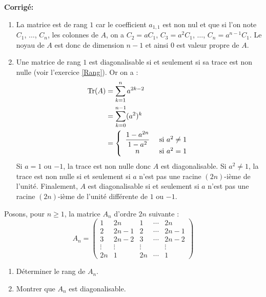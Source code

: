 \documentclass[a4paper,twoside,french,10pt]{VcCours}
\newcommand{\corr}{\textbf{Corrigé:}}
\begin{document}
\corr 
\begin{enumerate}
\item La matrice est de rang $1$ car le coefficient $a_{1,1}$ est non nul et que si l'on note $C_1$, $\ldots$, $C_n$, les colonnes de $A$, on a $C_2= aC_1$, $C_3=a^2 C_1$, $\ldots$, $C_n=a^{n-1} C_1$. Le noyau de $A$ est donc de dimension $n-1$ et ainsi $0$ est valeur propre de $A$.
\item Une matrice de rang $1$ est diagonalisable si et seulement si sa trace est non nulle (voir l'exercice \ref{Rang}). Or on a :
\begin{align*}
 \textrm{Tr}(A) & = \sum_{k=1}^n a^{2k-2} \\
 & = \sum_{k=0}^{n-1} (a^2)^k \\
 & = \left\lbrace \begin{array}{cl}
 \dfrac{1-a^{2n}}{1-a^2} & \hbox{ si } a^2 \neq 1 \\
 n & \hbox{ si } a^2 = 1 
 \end{array}\right. 
 \end{align*}
 Si $a=1$ ou $-1$, la trace est non nulle donc $A$ est diagonalisable. Si $a^2 \neq 1$, la trace est non nulle si et seulement si $a$ n'est pas une racine $(2n)$-ième de l'unité. Finalement, $A$ est diagonalisable si et seulement si $a$ n'est pas une racine $(2n)$-ième de l'unité différente de $1$ ou $-1$.
\end{enumerate}

\begin{Exercice}{} Posons, pour $n \geq 1$, la matrice $A_n$ d'ordre $2n$ suivante :
$$ A_n = \begin{pmatrix}
1 & 2n & 1 & \cdots & 2n \\
2 & 2n-1 & 2 & \cdots & 2n-1 \\
3 & 2n-2 & 3 & \cdots & 2n-2 \\
\vdots & \vdots & \vdots &  & \vdots \\
2n & 1 & 2n & \cdots & 1
\end{pmatrix}$$

\begin{enumerate}
\item Déterminer le rang de $A_n$.
\item Montrer que $A_n$ est diagonalisable.
\end{enumerate}
\end{Exercice}
\end{document}
